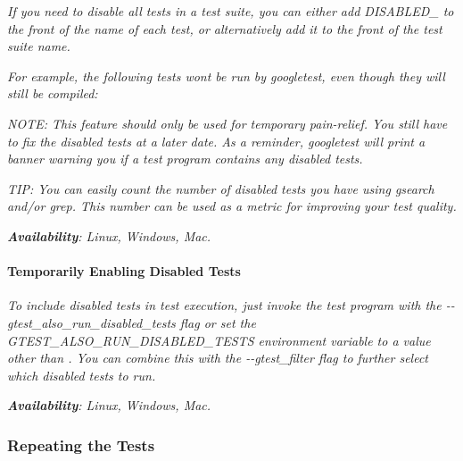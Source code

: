 {\itshape If you need to disable all tests in a test suite, you can either add {\ttfamily D\+I\+S\+A\+B\+L\+E\+D\+\_\+} to the front of the name of each test, or alternatively add it to the front of the test suite name.}

{\itshape For example, the following tests won\textquotesingle{}t be run by googletest, even though they will still be compiled\+:}

{\itshape 
\begin{DoxyCode}{0}
\DoxyCodeLine{}
\DoxyCodeLine{}
\end{DoxyCode}
}

{\itshape N\+O\+TE\+: This feature should only be used for temporary pain-\/relief. You still have to fix the disabled tests at a later date. As a reminder, googletest will print a banner warning you if a test program contains any disabled tests.}

{\itshape T\+IP\+: You can easily count the number of disabled tests you have using {\ttfamily gsearch} and/or {\ttfamily grep}. This number can be used as a metric for improving your test quality.}

{\itshape {\bfseries{Availability}}\+: Linux, Windows, Mac.}

{\itshape \paragraph*{Temporarily Enabling Disabled Tests}}

{\itshape }

{\itshape To include disabled tests in test execution, just invoke the test program with the {\ttfamily -\/-\/gtest\+\_\+also\+\_\+run\+\_\+disabled\+\_\+tests} flag or set the {\ttfamily G\+T\+E\+S\+T\+\_\+\+A\+L\+S\+O\+\_\+\+R\+U\+N\+\_\+\+D\+I\+S\+A\+B\+L\+E\+D\+\_\+\+T\+E\+S\+TS} environment variable to a value other than {}. You can combine this with the {\ttfamily -\/-\/gtest\+\_\+filter} flag to further select which disabled tests to run.}

{\itshape {\bfseries{Availability}}\+: Linux, Windows, Mac.}

{\itshape \subsubsection*{Repeating the Tests}}

